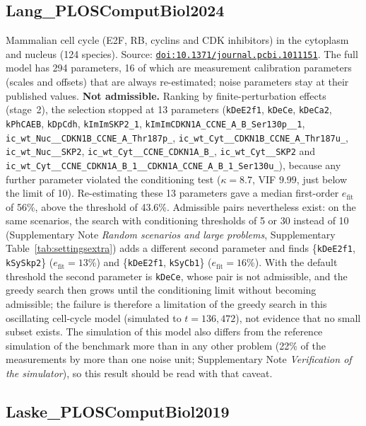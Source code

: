 \subsection*{Lang\_PLOSComputBiol2024}

Mammalian cell cycle (E2F, RB, cyclins and CDK inhibitors) in the cytoplasm and nucleus (124 species). Source: \href{https://doi.org/10.1371/journal.pcbi.1011151}{\nolinkurl{doi:10.1371/journal.pcbi.1011151}}. The full model has 294 parameters, 16 of which are measurement calibration parameters (scales and offsets) that are always re-estimated; noise parameters stay at their published values. \textbf{Not admissible.} Ranking by finite-perturbation effects (stage~2), the selection stopped at 13 parameters (\texttt{kDeE2f1}, \texttt{kDeCe}, \texttt{kDeCa2}, \texttt{kPhCAEB}, \texttt{kDpCdh}, \texttt{kImImSKP2\_1}, \texttt{kImImCDKN1A\_CCNE\_A\_B\_Ser130p\_\_1}, \texttt{ic\_wt\_Nuc\_\_CDKN1B\_CCNE\_A\_Thr187p\_}, \texttt{ic\_wt\_Cyt\_\_CDKN1B\_CCNE\_A\_Thr187u\_}, \texttt{ic\_wt\_Nuc\_\_SKP2}, \texttt{ic\_wt\_Cyt\_\_CCNE\_CDKN1A\_B\_}, \texttt{ic\_wt\_Cyt\_\_SKP2} and \texttt{ic\_wt\_Cyt\_\_CCNE\_CDKN1A\_B\_1\_\_CDKN1A\_CCNE\_A\_B\_1\_Ser130u\_}), because any further parameter violated the conditioning test ($\kappa=8.7$, VIF $9.99$, just below the limit of 10). Re-estimating these 13 parameters gave a median first-order $e_{\mathrm{fit}}$ of 56\%, above the threshold of 43.6\%. Admissible pairs nevertheless exist: on the same scenarios, the search with conditioning thresholds of 5 or 30 instead of 10 (Supplementary Note \emph{Random scenarios and large problems}, Supplementary Table~\ref{tab:settingsextra}) adds a different second parameter and finds \{\texttt{kDeE2f1}, \texttt{kSySkp2}\} ($e_{\mathrm{fit}}=13\%$) and \{\texttt{kDeE2f1}, \texttt{kSyCb1}\} ($e_{\mathrm{fit}}=16\%$). With the default threshold the second parameter is \texttt{kDeCe}, whose pair is not admissible, and the greedy search then grows until the conditioning limit without becoming admissible; the failure is therefore a limitation of the greedy search in this oscillating cell-cycle model (simulated to $t=136{,}472$), not evidence that no small subset exists. The simulation of this model also differs from the reference simulation of the benchmark more than in any other problem (22\% of the measurements by more than one noise unit; Supplementary Note \emph{Verification of the simulator}), so this result should be read with that caveat.

\subsection*{Laske\_PLOSComputBiol2019}

